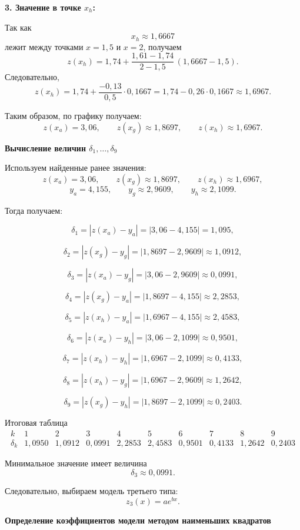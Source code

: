 \textbf{3. Значение в точке $x_h$:}

Так как
\[
    x_h\approx 1{,}6667
\]
лежит между точками $x=1{,}5$ и $x=2$, получаем
\[
    z(x_h)=1{,}74+\frac{1{,}61-1{,}74}{2-1{,}5}\,(1{,}6667-1{,}5).
\]
Следовательно,
\[
    z(x_h)=1{,}74+\frac{-0{,}13}{0{,}5}\cdot 0{,}1667
    =1{,}74-0{,}26\cdot 0{,}1667
    \approx 1{,}6967.
\]

Таким образом, по графику получаем:
\[
    z(x_a)=3{,}06,\qquad z(x_g)\approx 1{,}8697,\qquad z(x_h)\approx 1{,}6967.
\]


\textbf{Вычисление величин $\delta_1,\dots,\delta_9$}

Используем найденные ранее значения:
\[
    z(x_a)=3{,}06,\qquad z(x_g)\approx 1{,}8697,\qquad z(x_h)\approx 1{,}6967,
\]
\[
    y_a=4{,}155,\qquad y_g\approx 2{,}9609,\qquad y_h\approx 2{,}1099.
\]

Тогда получаем:

\[
    \delta_1=|z(x_a)-y_a|=|3{,}06-4{,}155|=1{,}095,
\]

\[
    \delta_2=|z(x_g)-y_g|=|1{,}8697-2{,}9609|\approx 1{,}0912,
\]

\[
    \delta_3=|z(x_a)-y_g|=|3{,}06-2{,}9609|\approx 0{,}0991,
\]

\[
    \delta_4=|z(x_g)-y_a|=|1{,}8697-4{,}155|\approx 2{,}2853,
\]

\[
    \delta_5=|z(x_h)-y_a|=|1{,}6967-4{,}155|\approx 2{,}4583,
\]

\[
    \delta_6=|z(x_a)-y_h|=|3{,}06-2{,}1099|\approx 0{,}9501,
\]

\[
    \delta_7=|z(x_h)-y_h|=|1{,}6967-2{,}1099|\approx 0{,}4133,
\]

\[
    \delta_8=|z(x_h)-y_g|=|1{,}6967-2{,}9609|\approx 1{,}2642,
\]

\[
    \delta_9=|z(x_g)-y_h|=|1{,}8697-2{,}1099|\approx 0{,}2403.
\]

Итоговая таблица
\[
    \begin{array}{c|c|c|c|c|c|c|c|c|c}
        k & 1 & 2 & 3 & 4 & 5 & 6 & 7 & 8 & 9 \\ \hline
        \delta_k & 1{,}0950 & 1{,}0912 & 0{,}0991 & 2{,}2853 & 2{,}4583 & 0{,}9501 & 0{,}4133 & 1{,}2642 & 0{,}2403
    \end{array}
\]


Минимальное значение имеет величина
\[
    \delta_3\approx 0{,}0991.
\]

Следовательно, выбираем модель третьего типа:
\[
    z_3(x)=ae^{bx}.
\]


\textbf{Определение коэффициентов модели методом наименьших квадратов}

